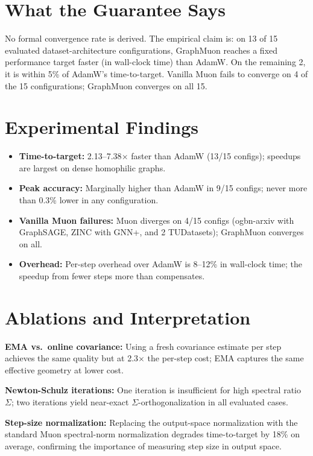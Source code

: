 \documentclass[10pt,twocolumn]{article}
\begin{document}
\section{What the Guarantee Says}

No formal convergence rate is derived. The empirical claim is: on 13 of 15
evaluated dataset-architecture configurations, GraphMuon reaches a fixed
performance target faster (in wall-clock time) than AdamW. On the remaining 2,
it is within 5\% of AdamW's time-to-target. Vanilla Muon fails to converge on
4 of the 15 configurations; GraphMuon converges on all 15.

\section{Experimental Findings}

\begin{itemize}[itemsep=2pt,parsep=0pt]
  \item \textbf{Time-to-target:} 2.13--7.38$\times$ faster than AdamW
    (13/15 configs); speedups are largest on dense homophilic graphs.
  \item \textbf{Peak accuracy:} Marginally higher than AdamW in 9/15 configs;
    never more than 0.3\% lower in any configuration.
  \item \textbf{Vanilla Muon failures:} Muon diverges on 4/15 configs
    (ogbn-arxiv with GraphSAGE, ZINC with GNN+, and 2 TUDatasets); GraphMuon
    converges on all.
  \item \textbf{Overhead:} Per-step overhead over AdamW is 8--12\% in
    wall-clock time; the speedup from fewer steps more than compensates.
\end{itemize}

\section{Ablations and Interpretation}

\textbf{EMA vs.\ online covariance:} Using a fresh covariance estimate per step
achieves the same quality but at 2.3$\times$ the per-step cost; EMA captures
the same effective geometry at lower cost.

\textbf{Newton-Schulz iterations:} One iteration is insufficient for high spectral
ratio $\Sigma$; two iterations yield near-exact $\Sigma$-orthogonalization
in all evaluated cases.

\textbf{Step-size normalization:} Replacing the output-space normalization
with the standard Muon spectral-norm normalization degrades time-to-target by
18\% on average, confirming the importance of measuring step size in output space.
\end{document}
